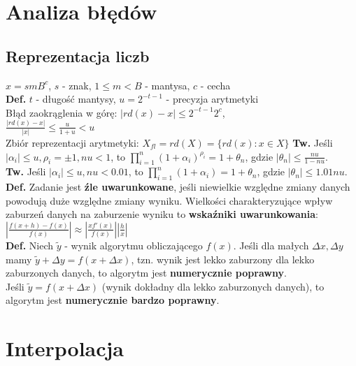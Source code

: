 \documentclass[a4paper,twocolumn]{article}
\begin{document}
\fontsize{7}{4}\selectfont


\section{Analiza błędów}
\subsection{Reprezentacja liczb}
$x = smB^c$, $s$ - znak, $1 \leq m < B$ - mantysa, $c$ - cecha \\
\textbf{Def.} $t$ - długość mantysy, $u = 2^{-t-1}$ - precyzja arytmetyki \\
Błąd zaokrąglenia w górę:
$|rd(x) - x| \leq 2^{-t-1} 2^c$, \\
$\frac{|rd(x) - x|}{|x|} \leq  \frac{u}{1+u} < u$ \\
Zbiór reprezentacji arytmetyki: $X_{fl} = rd(X) = \{rd(x) : x \in X \}$
\textbf{Tw.} Jeśli $|\alpha_i| \leq u, \rho_i = \pm 1, nu < 1$, to $\prod_{i = 1}^{n} (1 + \alpha_i)^{\rho_i} = 1 + \theta_n$, gdzie $|\theta_n| \leq \frac{nu}{1 - nu}$. \\
\textbf{Tw.} Jeśli $|\alpha_i| \leq u, nu < 0.01$, to $\prod_{i = 1}^{n} (1 + \alpha_i) = 1 + \theta_n$, gdzie $|\theta_n| \leq 1.01nu$. \\
\textbf{Def.} Zadanie jest \textbf{źle uwarunkowane}, jeśli niewielkie względne zmiany danych powodują duże względne zmiany wyniku. Wielkości charakteryzujące wpływ zaburzeń danych na zaburzenie wyniku to
\textbf{wskaźniki uwarunkowania}:\\
$|\frac{f(x+h)-f(x)}{f(x)}| \approx |\frac{xf'(x)}{f(x)}||\frac{h}{x}|$\\
\textbf{Def.} Niech $\tilde{y}$ - wynik algorytmu obliczającego $f(x)$. Jeśli dla małych $\Delta x, \Delta y$ mamy $\tilde{y} + \Delta y = f(x + \Delta x)$, tzn. wynik jest lekko zaburzony dla lekko zaburzonych danych, to algorytm jest \textbf{numerycznie poprawny}. \\
Jeśli $\tilde{y} = f(x + \Delta x)$ (wynik dokładny dla lekko zaburzonych danych), to algorytm jest \textbf{numerycznie bardzo poprawny}.\\
\section{Interpolacja}
\end{document}
